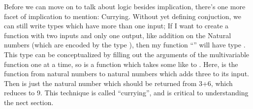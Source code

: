 Before we can move on to talk about logic besides implication, there's 
one more facet of implication to mention: Currying. Without yet defining
conjuction, we can still write types which have more than one input; If
I want to create a function with two inputs and only one output,
like addition on the Natural numbers (which are encoded by the 
type ), then my function ``'' will have type 
. This type can be conceptualized by
filling out the arguments of the multivariable function one at a time, so
 is a function which takes some
 like  to . Here,
 is the function from natural numbers to natural numbers
which adds three to its input. Then  is just the 
natural number which should be returned from 3+6, which reduces to 9.
This technique is called ``currying'', and is critical to understanding
the nect section.

